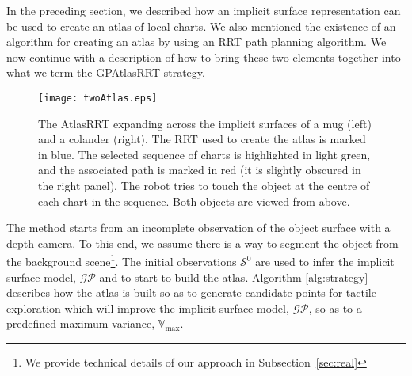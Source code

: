 In the preceding section, we described how an implicit surface representation can be used to create an atlas of local charts. We also mentioned the existence of an algorithm for creating an atlas by using an RRT path planning algorithm. We now continue with a description of how to bring these two elements together into what we term the GPAtlasRRT strategy. 

\begin{figure*}[t]
    \centering
    \texttt{[image: twoAtlas.eps]}
    \caption{The AtlasRRT expanding across the implicit surfaces of a mug (left) and a colander (right). The RRT used to create the atlas is marked in blue. The selected sequence of charts is highlighted in light green, and the associated path is marked in red (it is slightly obscured in the right panel). The robot tries to touch the object at the centre of each chart in the sequence. Both objects are viewed from above.}
    \label{fig:GPAtlasRRTtwo}
\end{figure*}

The method starts from an incomplete observation of the object surface with a depth camera. To this end, we assume there is a way to segment the object from the background scene\footnote{We provide technical details of our approach in Subsection~\ref{sec:real}}. 
The initial observations $\mathcal{S}^0$ are used to infer the implicit surface model, $\mathcal{GP}$ and to start to build the atlas. Algorithm \ref{alg:strategy} describes how the atlas is built so as to generate candidate points for tactile exploration which will improve the implicit surface model, $\mathcal{GP}$, so as to a predefined maximum variance, $\mathbb{V}_{\max}$. 

